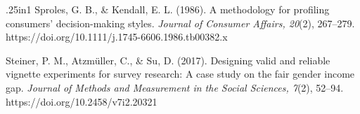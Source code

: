 \documentclass[stu,12pt,floatsintext]{apa7}
\begin{document}
\begin{hangparas}{.25in}{1}
Sproles, G. B., \& Kendall, E. L. (1986). A methodology for profiling consumers' decision-making styles. \textit{Journal of Consumer Affairs, 20}(2), 267--279. https://doi.org/10.1111/j.1745-6606.1986.tb00382.x

Steiner, P. M., Atzmüller, C., \& Su, D. (2017). Designing valid and reliable vignette experiments for survey research: A case study on the fair gender income gap. \textit{Journal of Methods and Measurement in the Social Sciences, 7}(2), 52--94. https://doi.org/10.2458/v7i2.20321
\end{hangparas}
\end{document}
